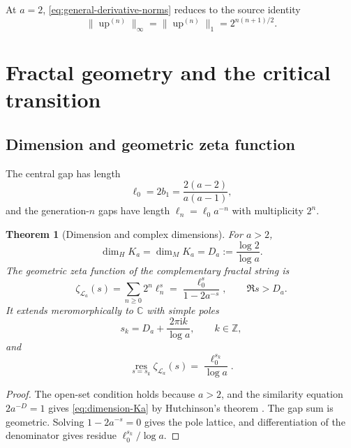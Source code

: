 \documentclass[11pt,oneside]{article}
\newtheorem{theorem}{Theorem}[section]
\theoremstyle{definition}
\theoremstyle{remark}
\newcommand{\C}{\mathbb C}
\newcommand{\Z}{\mathbb Z}
\newcommand{\Up}{\operatorname{up}}
\newcommand{\ii}{\mathrm i}
\begin{document}
At $a=2$, \eqref{eq:general-derivative-norms} reduces to the source identity
\begin{equation}
 \|\Up^{(n)}\|_\infty=\|\Up^{(n)}\|_1=2^{n(n+1)/2}.
 \tag{S3.64}
\end{equation}

\section{Fractal geometry and the critical transition}
\label{sec:fractal}

\subsection{Dimension and geometric zeta function}

The central gap has length
\begin{equation}
 \ell_0=2b_1=\frac{2(a-2)}{a(a-1)},
 \label{eq:ell0}
\end{equation}
and the generation-$n$ gaps have length $\ell_n=\ell_0a^{-n}$ with multiplicity $2^n$.

\begin{theorem}[Dimension and complex dimensions]
\label{thm:complex-dimensions}
For $a>2$,
\begin{equation}
 \dim_HK_a=\dim_MK_a=D_a:=\frac{\log2}{\log a}.
 \label{eq:dimension-Ka}
\end{equation}
The geometric zeta function of the complementary fractal string is
\begin{equation}
 \zeta_{\mathcal L_a}(s)
 =\sum_{n\ge0}2^n\ell_n^s
 =\frac{\ell_0^s}{1-2a^{-s}},
 \qquad \Re s>D_a.
 \label{eq:fractal-zeta}
\end{equation}
It extends meromorphically to $\C$ with simple poles
\begin{equation}
 s_k=D_a+\frac{2\pi\ii k}{\log a},\qquad k\in\Z,
 \label{eq:complex-dimensions}
\end{equation}
and
\begin{equation}
 \operatorname*{res}_{s=s_k}\zeta_{\mathcal L_a}(s)
 =\frac{\ell_0^{s_k}}{\log a}.
 \label{eq:zeta-residue}
\end{equation}
\end{theorem}

\begin{proof}
The open-set condition holds because $a>2$, and the similarity equation
$2a^{-D}=1$ gives \eqref{eq:dimension-Ka} by Hutchinson's theorem
\cite{hutchinson1981}.  The gap sum is geometric.  Solving $1-2a^{-s}=0$ gives the pole
lattice, and differentiation of the denominator gives residue $\ell_0^{s_k}/\log a$.
\end{proof}
\end{document}
